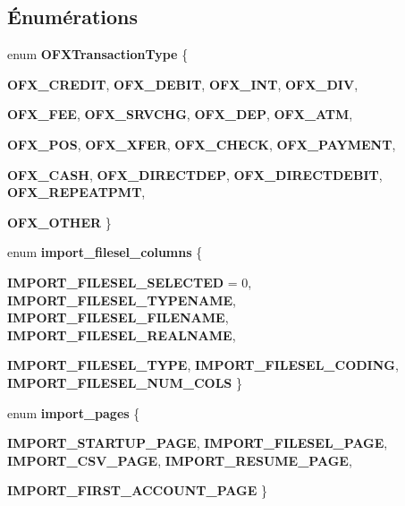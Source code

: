 \subsection*{Énumérations}
\begin{DoxyCompactItemize}
\item 
enum {\bf OFXTransactionType} \{ \par
{\bf OFX\_\-CREDIT}, 
{\bf OFX\_\-DEBIT}, 
{\bf OFX\_\-INT}, 
{\bf OFX\_\-DIV}, 
\par
{\bf OFX\_\-FEE}, 
{\bf OFX\_\-SRVCHG}, 
{\bf OFX\_\-DEP}, 
{\bf OFX\_\-ATM}, 
\par
{\bf OFX\_\-POS}, 
{\bf OFX\_\-XFER}, 
{\bf OFX\_\-CHECK}, 
{\bf OFX\_\-PAYMENT}, 
\par
{\bf OFX\_\-CASH}, 
{\bf OFX\_\-DIRECTDEP}, 
{\bf OFX\_\-DIRECTDEBIT}, 
{\bf OFX\_\-REPEATPMT}, 
\par
{\bf OFX\_\-OTHER}
 \}
\item 
enum {\bf import\_\-filesel\_\-columns} \{ \par
{\bf IMPORT\_\-FILESEL\_\-SELECTED} =  0, 
{\bf IMPORT\_\-FILESEL\_\-TYPENAME}, 
{\bf IMPORT\_\-FILESEL\_\-FILENAME}, 
{\bf IMPORT\_\-FILESEL\_\-REALNAME}, 
\par
{\bf IMPORT\_\-FILESEL\_\-TYPE}, 
{\bf IMPORT\_\-FILESEL\_\-CODING}, 
{\bf IMPORT\_\-FILESEL\_\-NUM\_\-COLS}
 \}
\item 
enum {\bf import\_\-pages} \{ \par
{\bf IMPORT\_\-STARTUP\_\-PAGE}, 
{\bf IMPORT\_\-FILESEL\_\-PAGE}, 
{\bf IMPORT\_\-CSV\_\-PAGE}, 
{\bf IMPORT\_\-RESUME\_\-PAGE}, 
\par
{\bf IMPORT\_\-FIRST\_\-ACCOUNT\_\-PAGE}
 \}
\end{DoxyCompactItemize}
